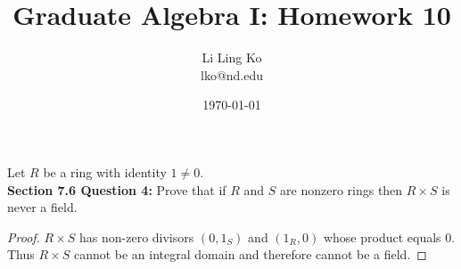 \documentclass{article}
\begin{document}
\title{Graduate Algebra I: Homework 10}
\author{Li Ling Ko\\ lko@nd.edu}
\date{\today}
\maketitle

Let $R$ be a ring with identity $1\neq0$. \\

\textbf{Section 7.6 Question 4:} Prove that if $R$ and $S$ are nonzero
  rings then $R\times S$ is never a field.
  \begin{proof}
    $R\times S$ has non-zero divisors $(0,1_S)$ and $(1_R,0)$ whose
    product equals 0. Thus $R\times S$ cannot be an integral domain and
    therefore cannot be a field.
  \end{proof}
\end{document}
